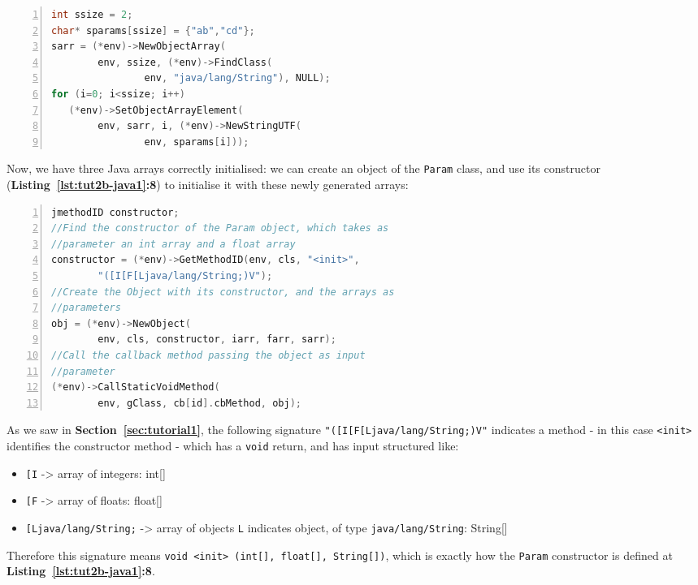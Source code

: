 \documentclass[a4paper,10pt]{article}
\newcommand{\keyword}[1]{\texttt{#1}}
\newcommand{\refl}[1]{\textbf{Listing~\ref{#1}}}
\newcommand{\refs}[1]{\textbf{Section~\ref{#1}}}
\begin{document}
\begin{multicols}{2}
\begin{lstlisting}[language=C,
		   columns=fullflexible,
		   showstringspaces=false,
		   xleftmargin=15pt,
		   frame = l,
		   numbers=left,
		   commentstyle=\color{gray}\upshape]
int ssize = 2;
char* sparams[ssize] = {"ab","cd"};
sarr = (*env)->NewObjectArray(
		env, ssize, (*env)->FindClass(
				env, "java/lang/String"), NULL);
for (i=0; i<ssize; i++)
   (*env)->SetObjectArrayElement(
   		env, sarr, i, (*env)->NewStringUTF(
   				env, sparams[i]));
\end{lstlisting}
Now, we have three Java arrays correctly initialised: we can create an object
of the \keyword{Param} class, and use its constructor
(\refl{lst:tut2b-java1}\textbf{:8}) to initialise it with these newly
generated arrays:
\begin{lstlisting}[language=C,
		   columns=fullflexible,
		   showstringspaces=false,
		   xleftmargin=15pt,
		   frame = l,
		   numbers=left,
		   commentstyle=\color{gray}\upshape]
jmethodID constructor;
//Find the constructor of the Param object, which takes as
//parameter an int array and a float array
constructor = (*env)->GetMethodID(env, cls, "<init>",
		"([I[F[Ljava/lang/String;)V");
//Create the Object with its constructor, and the arrays as
//parameters
obj = (*env)->NewObject(
		env, cls, constructor, iarr, farr, sarr);
//Call the callback method passing the object as input
//parameter
(*env)->CallStaticVoidMethod(
		env, gClass, cb[id].cbMethod, obj);
\end{lstlisting}
As we saw in \refs{sec:tutorial1}, the following signature
\keyword{"([I[F[Ljava/lang/String;)V"} indicates a method - in this case
\keyword{<init>} identifies the constructor method - which has a \keyword{void}
return, and has input structured like:
\begin{itemize}
\item \keyword{[I} -> array of integers: int[]
\item \keyword{[F} -> array of floats: float[]
\item \keyword{[Ljava/lang/String;} -> array of objects \keyword{L} indicates
object, of type \keyword{java/lang/String}: String[]
\end{itemize}
Therefore this signature means \keyword{void <init> (int[], float[], String[])},
which is exactly how the \keyword{Param} constructor is defined at
\refl{lst:tut2b-java1}\textbf{:8}.



\end{multicols}
\end{document}
